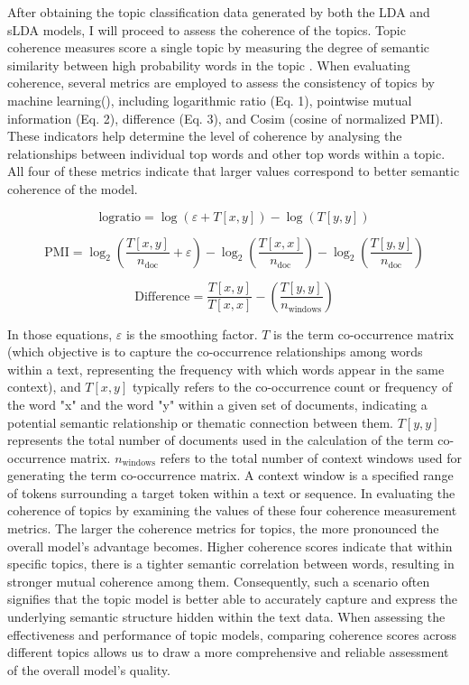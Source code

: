 \documentclass[12pt,twoside]{article}
\begin{document}
After obtaining the topic classification data generated by both the LDA and sLDA models, I will proceed to assess the coherence of the topics. Topic coherence measures score a single topic by measuring the degree of semantic similarity between high probability words in the topic \cite{Kapadia2019}. When evaluating coherence, several metrics are employed to assess the consistency of topics by machine learning(\cite{Selivanov2016}), including logarithmic ratio (Eq. 1), pointwise mutual information (Eq. 2), difference (Eq. 3), and Cosim (cosine of normalized PMI). These indicators help determine the level of coherence by analysing the relationships between individual top words and other top words within a topic. All four of these metrics indicate that larger values correspond to better semantic coherence of the model.

\begin{equation}
    \text{logratio} = \log(\varepsilon + T[x,y]) - \log(T[y,y])
\end{equation}

\begin{equation}
    \text{PMI} = \log_2\left(\frac{T[x,y]}{n_{\text{doc}}} + \varepsilon\right) - \log_2\left(\frac{T[x,x]}{n_{\text{doc}}}\right) - \log_2\left(\frac{T[y,y]}{n_{\text{doc}}}\right)
\end{equation}

\begin{equation}
    \text{Difference} = \frac{T[x,y]}{T[x,x]} - \left(\frac{T[y,y]}{n_{\text{windows}}}\right)
\end{equation}

In those equations, \(\varepsilon\) is the smoothing factor. \(T\) is the term co-occurrence matrix (which objective is to capture the co-occurrence relationships among words within a text, representing the frequency with which words appear in the same context), and \(T[x,y]\) typically refers to the co-occurrence count or frequency of the word "x" and the word "y" within a given set of documents, indicating a potential semantic relationship or thematic connection between them. \(T[y,y]\) represents the total number of documents used in the calculation of the term co-occurrence matrix. \(n_{\text{windows}}\) refers to the total number of context windows used for generating the term co-occurrence matrix. A context window is a specified range of tokens surrounding a target token within a text or sequence. In evaluating the coherence of topics by examining the values of these four coherence measurement metrics. The larger the coherence metrics for topics, the more pronounced the overall model's advantage becomes. Higher coherence scores indicate that within specific topics, there is a tighter semantic correlation between words, resulting in stronger mutual coherence among them. Consequently, such a scenario often signifies that the topic model is better able to accurately capture and express the underlying semantic structure hidden within the text data. When assessing the effectiveness and performance of topic models, comparing coherence scores across different topics allows us to draw a more comprehensive and reliable assessment of the overall model's quality.\\\\
\end{document}
